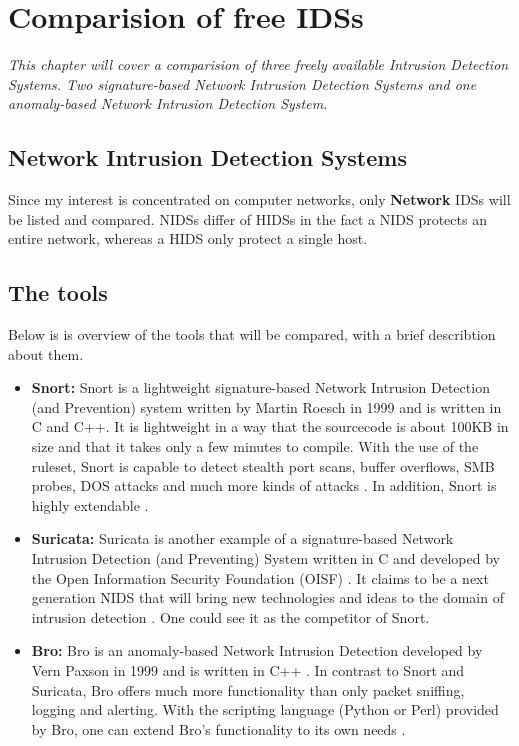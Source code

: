 \chapter{Comparision of free IDSs}
\minitoc
\emph{This chapter will cover a comparision of three freely available Intrusion Detection Systems. Two signature-based Network Intrusion Detection Systems and one anomaly-based Network Intrusion Detection System. }

\section{Network Intrusion Detection Systems}

Since my interest is concentrated on computer networks, only \textbf{Network} IDSs will be listed and compared. NIDSs differ of HIDSs in the fact a NIDS protects an entire network, whereas a HIDS only protect a single host.

\section{The tools}

Below is is overview of the tools that will be compared, with a brief describtion about them.
\begin{itemize}
\item \textbf{Snort:} Snort is a lightweight signature-based Network Intrusion Detection (and Prevention) system written by Martin Roesch in 1999 and is written in C and C++. It is lightweight in a way that the sourcecode is about 100KB in size and that it takes only a few minutes to compile. With the use of the ruleset, Snort is capable to detect stealth port scans, buffer overflows, SMB probes, DOS attacks and much more kinds of attacks \citep{SnortChap3}. In addition, Snort is highly extendable \citep{SnortSF}.
\item \textbf{Suricata:} Suricata is another example of a signature-based Network Intrusion Detection (and Preventing) System written in C and developed by the Open Information Security Foundation (OISF) \citep{Suricata2}. It claims to be a next generation NIDS that will bring new technologies and ideas to the domain of intrusion detection \citep{Suricata1}. One could see it as the competitor of Snort.
\item \textbf{Bro:} Bro is an anomaly-based Network Intrusion Detection developed by Vern Paxson in 1999 and is written in C++ \citep{Bro1}. In contrast to Snort and Suricata, Bro offers much more functionality than only packet sniffing, logging and alerting. With the scripting language (Python or Perl) provided by Bro, one can extend Bro's functionality to its own needs \citep{Bro2}.
\end{itemize}


